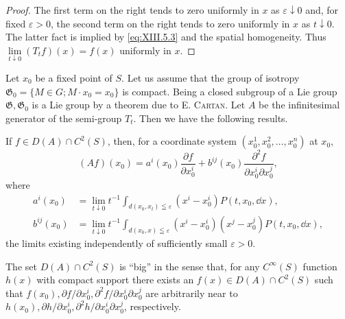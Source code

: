 \begin{proof}
The first term on the right tends to zero uniformly in $x$ as $\varepsilon \downarrow 0$ and, for fixed $\varepsilon > 0$, the second term on the right tends to zero uniformly in $x$ as $t \downarrow 0$. The latter fact is implied by \eqref{eq:XIII.5.3} and the spatial homogeneity. Thus $\lim\limits_{t \downarrow 0} (T_t f)(x) = f(x)$ uniformly in $x$.
\end{proof}

\begin{theoremu} Let $x_0$ be a fixed point of $S$. Let us assume that the group of isotropy $\mathfrak{G}_0 = \{M \in G; M \cdot x_0 = x_0\}$ is compact. Being a closed subgroup of a Lie group $\mathfrak{G}, \mathfrak{G}_0$ is a Lie group by a theorem due to E. \textsc{Cartan}. Let $A$ be the infinitesimal generator of the semi-group $T_t$. Then we have the following results. 


\begin{enumerate}[{[}1{]}]
\item If $f \in D(A) \cap C^2(S)$, then, for a coordinate system $(x_0^1, x_0^2, \ldots, x_0^n)$ at $x_0$, 
\begin{equation}\label{eq:XIII.5.6}
(A f) (x _{0}) = a ^{i} (x _{0}) \frac {\partial f}{\partial x _{0} ^{i}} + b ^{ij} (x _{0}) \frac {\partial^{2} f}{\partial x _{0} ^{i} \partial x _{0} ^{j}},
\end{equation}
where 
\begin{align}
a ^{i} \left(x _{0}\right)& = \lim\limits _{t \downarrow 0} t ^{-1} \int_ {d \left(x _{0}, x _{t}\right) \leqq \varepsilon} \left(x ^{i} - x _{0} ^{i}\right) P (t, x _{0}, \dd x), \label{eq:XIII.5.7} \\
b ^{ij} (x _{0})& = \lim\limits _{t \downarrow 0} t ^{-1} \int_ {d (x _{0}, x) \leqq \varepsilon} \left(x ^{i} - x _{0} ^{i}\right) \left(x ^{j} - x _{0} ^{j}\right) P (t, x _{0}, \dd x), \label{eq:XIII.5.8}
\end{align}
the limits existing independently of sufficiently small $\varepsilon > 0$. 

\item The set $D(A) \cap C^2(S)$ is ``big'' in the sense that, for any $C^\infty(S)$ function $h(x)$ with compact support there exists an $f(x) \in D(A) \cap C^2(S)$ such that $f(x_0), \partial f / \partial x_0^i, \partial^2 f / \partial x_0^i \partial x_0^j$ are arbitrarily near to $h(x_0), \partial h / \partial x_0^i, \partial^2 h / \partial x_0^i \partial x_0^j$, respectively. 

\end{enumerate}
\end{theoremu}

